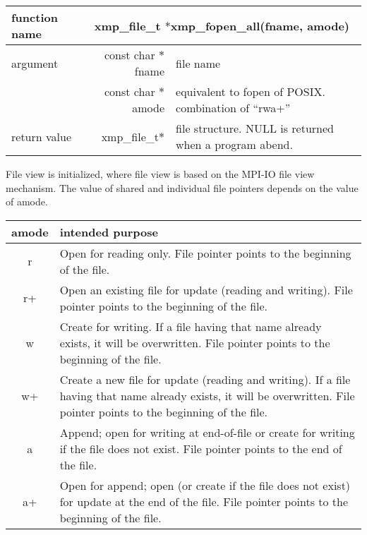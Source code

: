    \begin{table}[h]
    \begin{center}
      \begin{tabular}{|l|r|p{90mm}|}
      \hline
      {\bf function name}  & \multicolumn{2}{c|}{\bf xmp\_file\_t
      $*$xmp\_fopen\_all(fname, amode)}  \\ \hline \hline
      argument & const char $*$fname & file name \\ \cline{2-3}
      & const char $*$amode & equivalent to fopen of POSIX. combination
	      of ``rwa+'' \\ \hline
      return value & xmp\_file\_t$*$ & file structure. NULL is returned
	      when a program abend. \\ \hline
      \end{tabular}
     \end{center}
   \end{table}

   File view is initialized, where file view is based on the MPI-IO file
   view mechanism. The value of shared and individual file pointers
   depends on the value of amode.

   \begin{table}[h]
     \begin{center}
    \begin{tabular}{|c|p{120mm}|}
      \hline
     amode & intended purpose \\ \hline \hline
     r &  Open for reading only. File pointer points to the beginning of
	 the file.\\ \hline
     r+ & Open an existing file for update (reading and writing). File
	 pointer points to the beginning of the file. \\ \hline
     w &  Create for writing. If a file having that name already exists, it
	 will be overwritten. File pointer points to the beginning of the file. \\ \hline
     w+ & Create a new file for update (reading and writing). If a file
	 having that name already exists, it will be overwritten. File
	 pointer points to the beginning of the file. \\ \hline
     a & Append; open for writing at end-of-file or create for writing
	 if the file does not exist. File pointer points to the end of the file. \\ \hline
     a+ & Open for append; open (or create if the file does not exist)
	 for update at the end of the file. File pointer points to the
	 beginning of the file. \\ \hline
    \end{tabular}
   \end{center}
   \end{table}

